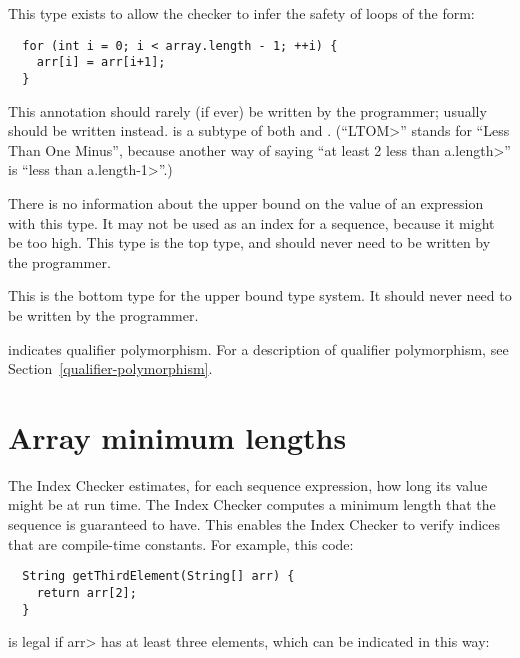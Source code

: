 \begin{description}
  This type exists to allow the checker to infer the safety of loops of
  the form:
\begin{Verbatim}
  for (int i = 0; i < array.length - 1; ++i) {
    arr[i] = arr[i+1];
  }
\end{Verbatim}
  This annotation should rarely (if ever) be written by the programmer; usually
  should be written instead.
   is a subtype of both
   and .
  (``\<LTOM>'' stands for ``Less Than One Minus'', because another way of
  saying ``at least 2 less than \<a.length>'' is ``less than \<a.length-1>''.)

\item[\refqualclass{checker/index/qual}{UpperBoundUnknown}]
  There is no information about the upper bound on the value of an expression with this type.
  It may not be used as an index for a sequence, because it might be too high.
  This type is the top type, and should never need to be written by the
  programmer.

\item[\refqualclass{checker/index/qual}{UpperBoundBottom}]
  This is the bottom type for the upper bound type system. It should
  never need to be written by the programmer.

 \item[\refqualclass{checker/index/qual}{PolyUpperBound}]
   indicates qualifier polymorphism.
   For a description of qualifier polymorphism, see
   Section~\ref{qualifier-polymorphism}.

\end{description}


\section{Array minimum lengths\label{index-minlen}}

The Index Checker estimates, for each sequence expression, how long its value
might be at run time.  The Index Checker computes a minimum length that
the sequence is guaranteed to have.  This enables the Index Checker to
verify indices that are compile-time constants.  For example, this code:

\begin{Verbatim}
  String getThirdElement(String[] arr) {
    return arr[2];
  }
\end{Verbatim}

\noindent
is legal if \<arr> has at least three elements, which can be indicated
in this way:

